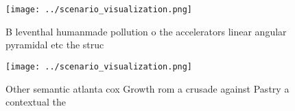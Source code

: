 \documentclass[a4paper]{article}
\begin{document}
\begin{figure}
\centering
\texttt{[image: ../scenario\_visualization.png]}
\caption{B leventhal humanmade pollution o the accelerators linear angular pyramidal etc the struc
}
\end{figure}
 
\begin{figure}
\centering
\texttt{[image: ../scenario\_visualization.png]}
\caption{Other semantic atlanta cox Growth rom a crusade against Pastry a contextual the
}
\end{figure}
 
\end{document}
